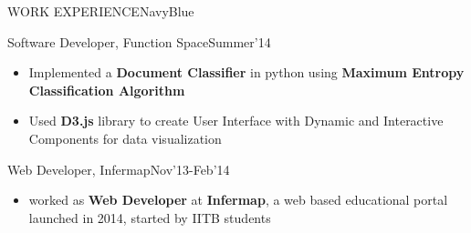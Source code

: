 \documentclass[11pt]{book} %
\begin{document}
\begin{ressection}{WORK EXPERIENCE}{NavyBlue}

\begin{ressubsection}{Software Developer, Function Space}{Summer'14}{}
\begin{itemize}
\itemsep-0.1em
\item Implemented a \textbf{Document Classifier} in python using \textbf{Maximum Entropy Classification Algorithm}
\item Used \textbf{D3.js} library to create User Interface with Dynamic and Interactive Components for data visualization
\end{itemize}
\end{ressubsection}

\begin{ressubsection}{Web Developer, Infermap}{Nov'13-Feb'14}{}
\begin{itemize}
\itemsep-0.1em
\item worked as \textbf{Web Developer} at \textbf{Infermap}, a web based educational portal launched in 2014, started by IITB students
\end{itemize}
\end{ressubsection}
  
\end{ressection}
\end{document}
